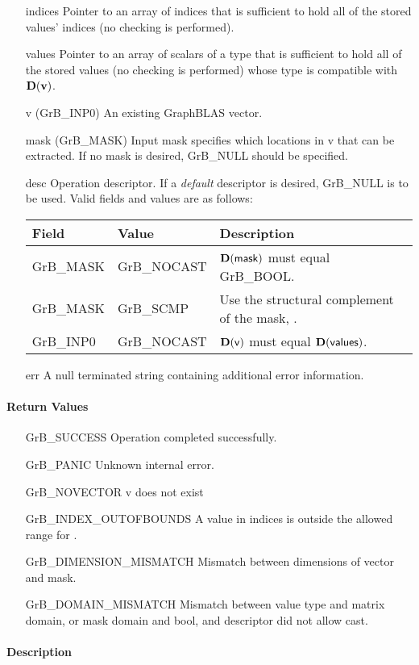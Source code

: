 \begin{itemize}[leftmargin=1.1in]
    \item[{\sf indices}] Pointer to an array of indices that is sufficient to
                        hold all of the stored values' indices (no checking is performed).
    \item[{\sf values}] Pointer to an array of scalars of a type that is sufficient to
                        hold all of the stored values (no checking is performed) whose
                        type is compatible with $\bold{D}({\bf v})$.
    \item[{\sf v}]      ({\sf GrB\_INP0}) An existing GraphBLAS vector.
    \item[{\sf mask}]   ({\sf GrB\_MASK}) Input mask specifies which locations in
                        {\sf v} that can be extracted.  If no mask is desired,
                        {\sf GrB\_NULL} should be specified.
    \item[{\sf desc}]   Operation descriptor. If a
    \emph{default} descriptor is desired, {\sf GrB\_NULL} is to be
    used.  Valid fields and values are as follows: \\
    \begin{tabular}{llp{3in}}
    Field  & Value & Description \\
    \hline
    {\sf GrB\_MASK} & {\sf GrB\_NOCAST} & $\bold{D}({\sf mask})$ must equal {\sf GrB\_BOOL}. \\
    {\sf GrB\_MASK} & {\sf GrB\_SCMP}   & Use the structural complement of the mask, . \\
    {\sf GrB\_INP0} & {\sf GrB\_NOCAST} & $\bold{D}({\sf v})$ must equal $\bold{D}({\sf values})$. \\
    \end{tabular}
    \item[{\sf err}]     A null terminated string containing additional error information.
\end{itemize}

\paragraph{Return Values}

\begin{itemize}[leftmargin=2.1in]
    \item[{\sf GrB\_SUCCESS}]     Operation completed successfully.
    \item[{\sf GrB\_PANIC}]            Unknown internal error.
    \item[{\sf GrB\_NOVECTOR}]      {\sf v} does not exist
    \item[{\sf GrB\_INDEX\_OUTOFBOUNDS}]
                       A value in {\sf indices} is outside the allowed range for .
    \item[\sf GrB\_DIMENSION\_MISMATCH]  
                       Mismatch between dimensions of vector and mask. 
    \item[\sf GrB\_DOMAIN\_MISMATCH]  
                       Mismatch between value type and matrix domain, or mask domain and {\sf bool}, and descriptor did not allow cast.
\end{itemize}


\paragraph{Description}
